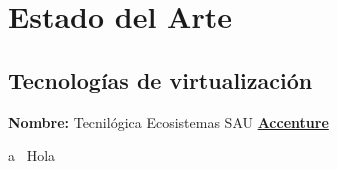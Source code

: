 \documentclass[a4paper, 12pt]{report} %
\begin{document}
	
	
        \tableofcontents
        \chapter{Estado del Arte}
	\section{Tecnologías de virtualización}
	\textbf{Nombre:} Tecnilógica Ecosistemas SAU \href{https://www.accenture.com/es-es/company-tecnilogica-accenture}{\textbf{\color{blue}Accenture}}
	\par a~\cite{buffett84} Hola ~\cite{watson53}
	\printbibliography[heading=bibintoc]
\end{document}
